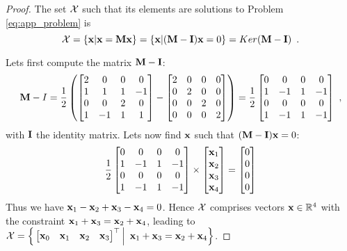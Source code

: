 \begin{proof}
	The set $\mathcal{X}$ such that its elements are solutions to Problem \ref{eq:app_problem} is
	$$
	\setX = \{\vx | \vx = \mm\vx\} = \{\vx | (\mm - \mi)\vx = 0\}  = Ker(\mm - \mi)\enspace.
	$$

	Lets first compute the matrix $\mm-\mi$:
	\begin{equation*}
		\begin{split}
			\mm - I = \frac{1}{2} \left( 
			\begin{bmatrix}
				2 & 0 & 0 & 0 \\
				1 & 1 & 1 & -1 \\
				0 & 0 & 2 & 0 \\
				1 & -1 & 1 & 1
			\end{bmatrix} -
			\begin{bmatrix}
				2 & 0 & 0 & 0 \\
				0 & 2 & 0 & 0 \\
				0 & 0 & 2 & 0 \\
				0 & 0 & 0 & 2
			\end{bmatrix}
			\right)
			= \frac{1}{2}\begin{bmatrix}
				0 & 0 & 0 & 0 \\
				1 & -1 & 1 & -1 \\
				0 & 0 & 0 & 0 \\
				1 & -1 & 1 & -1
			\end{bmatrix}
		\end{split} \enspace,
	\end{equation*}
	 with $\mi$ the identity matrix. Lets now find $\textbf{x}$ such that $(\mm - \mi)\vx = 0$:
	$$
	\frac{1}{2}\begin{bmatrix}
		0 & 0 & 0 & 0 \\
		1 & -1 & 1 & -1 \\
		0 & 0 & 0 & 0 \\
		1 & -1 & 1 & -1
	\end{bmatrix} 
	\times
	\begin{bmatrix}
		\textbf{x}_1 \\
		\textbf{x}_2 \\
		\textbf{x}_3 \\
		\textbf{x}_4
	\end{bmatrix} = 
	\begin{bmatrix}
		0 \\
		0 \\
		0 \\
		0
	\end{bmatrix}
	$$
	Thus we have $\textbf{x}_1 - \textbf{x}_2 + \textbf{x}_3 - \textbf{x}_4 = 0$. Hence $\mathcal{X}$ comprises vectors $\textbf{x}\in\mathbb{R}^4$ with the constraint $\textbf{x}_1 + \textbf{x}_3 = \textbf{x}_2 + \textbf{x}_4$, leading to $\mathcal{X} = \Big\{\begin{bmatrix}	\textbf{x}_0 & \textbf{x}_1 & \textbf{x}_2 & \textbf{x}_3 \end{bmatrix}^\top \Big|\enspace \textbf{x}_1 + \textbf{x}_3 = \textbf{x}_2 + \textbf{x}_4\Big\}$.
\end{proof}